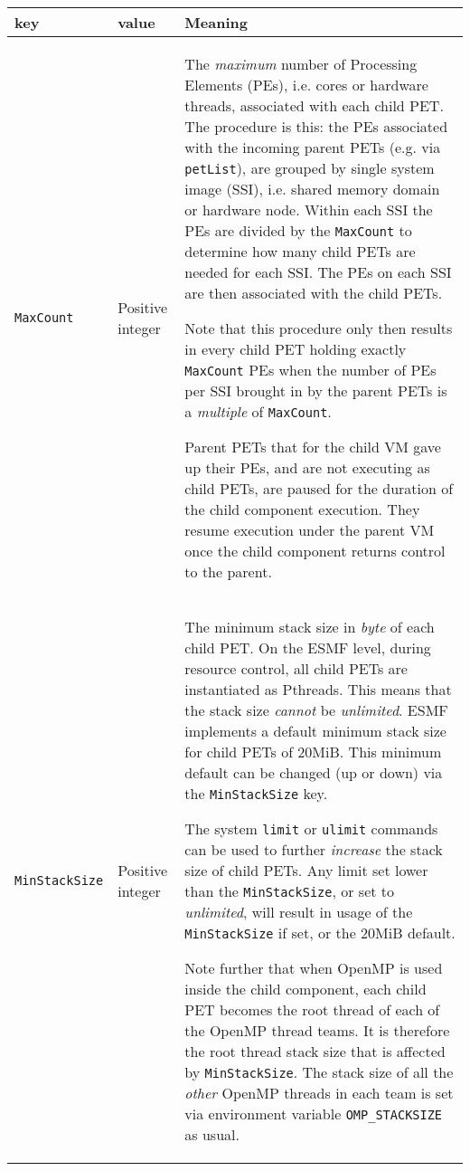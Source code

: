 \vspace*{2ex}
\begin{longtable}[h]{|p{}|p{}|p{}|}
     \hline\hline
     {\bf key} & {\bf value} & {\bf Meaning}\\
     \hline\hline
     
     {\tt MaxCount}         & Positive integer    &
        The {\em maximum} number of Processing Elements (PEs), i.e. cores or hardware threads, associated with each child PET. The procedure is this: the PEs associated with the incoming parent PETs (e.g. via {\tt petList}), are grouped by single system image (SSI), i.e. shared memory domain or hardware node. Within each SSI the PEs are divided by the {\tt MaxCount} to determine how many child PETs are needed for each SSI. The PEs on each SSI are then associated with the child PETs.
        
        Note that this procedure only then results in every child PET holding exactly {\tt MaxCount} PEs when the number of PEs per SSI brought in by the parent PETs is a {\em multiple} of {\tt MaxCount}.
         
        Parent PETs that for the child VM gave up their PEs, and are not executing as child PETs, are paused for the duration of the child component execution. They resume execution under the parent VM once the child component returns control to the parent. \\ \hline
        
     {\tt MinStackSize}     & Positive integer   &
        The minimum stack size in {\em byte} of each child PET. On the ESMF level, during resource control, all child PETs are instantiated as Pthreads. This means that the stack size {\em cannot} be {\em unlimited}. ESMF implements a default minimum stack size for child PETs of 20MiB. This minimum default can be changed (up or down) via the {\tt MinStackSize} key.
        
        The system {\tt limit} or {\tt ulimit} commands can be used to further {\em increase} the stack size of child PETs. Any limit set lower than the {\tt MinStackSize}, or set to {\em unlimited}, will result in usage of the {\tt MinStackSize} if set, or the 20MiB default.
        
        Note further that when OpenMP is used inside the child component, each child PET becomes the root thread of each of the OpenMP thread teams. It is therefore the root thread stack size that is affected by {\tt MinStackSize}. The stack size of all the {\em other} OpenMP threads in each team is set via environment variable {\tt OMP\_STACKSIZE} as usual.
        \\ \hline


\end{longtable}
